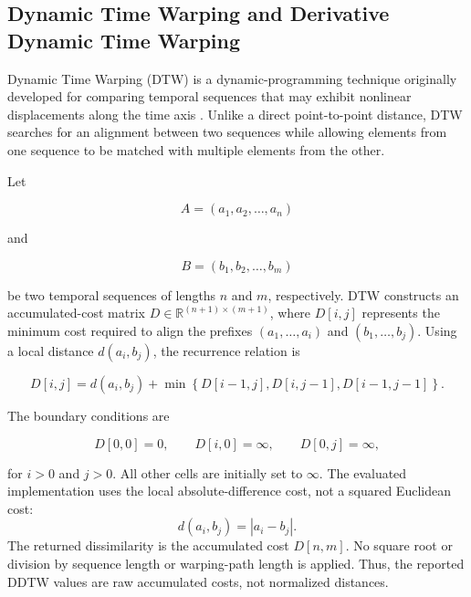 \documentclass[journal,article,submit,moreauthors]{Definitions/mdpi}
\begin{document}
\subsection{Dynamic Time Warping and Derivative Dynamic Time Warping}

Dynamic Time Warping (DTW) is a dynamic-programming technique originally
developed for comparing temporal sequences that may exhibit nonlinear
displacements along the time axis \cite{sakoe1978dynamic}. Unlike a direct
point-to-point distance, DTW searches for an alignment between two sequences
while allowing elements from one sequence to be matched with multiple
elements from the other.

Let

\begin{equation}
A = (a_1,a_2,\ldots,a_n)
\end{equation}

and

\begin{equation}
B = (b_1,b_2,\ldots,b_m)
\end{equation}

be two temporal sequences of lengths $n$ and $m$, respectively. DTW constructs
an accumulated-cost matrix $D \in \mathbb{R}^{(n+1)\times(m+1)}$, where
$D[i,j]$ represents the minimum cost required to align the prefixes
$(a_1,\ldots,a_i)$ and $(b_1,\ldots,b_j)$. Using a local distance
$d(a_i,b_j)$, the recurrence relation is

\begin{equation}
D[i,j] =
d(a_i,b_j)
+
\min
\left\{
D[i-1,j],
D[i,j-1],
D[i-1,j-1]
\right\}.
\end{equation}

The boundary conditions are

\begin{equation}
D[0,0]=0,
\qquad
D[i,0]=\infty,
\qquad
D[0,j]=\infty,
\end{equation}

for $i>0$ and $j>0$. All other cells are initially set to $\infty$.
The evaluated implementation uses the local absolute-difference cost,
not a squared Euclidean cost:
\begin{equation}
d(a_i,b_j)=|a_i-b_j|.
\label{eq:dtw_local_cost}
\end{equation}
The returned dissimilarity is the accumulated cost $D[n,m]$. No square root
or division by sequence length or warping-path length is applied. Thus, the
reported DDTW values are raw accumulated costs, not normalized distances.
\end{document}
